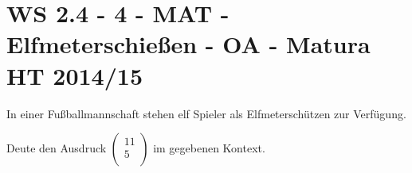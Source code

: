 \section{WS 2.4 - 4 - MAT - Elfmeterschießen - OA - Matura HT 2014/15}

\begin{beispiel}[WS 2.4]{1} %
In einer Fußballmannschaft stehen elf Spieler als Elfmeterschützen zur Verfügung. \leer

Deute den Ausdruck $\begin{pmatrix}
	11 \\ 5 \\
\end{pmatrix}$ im gegebenen Kontext. 

\end{beispiel}